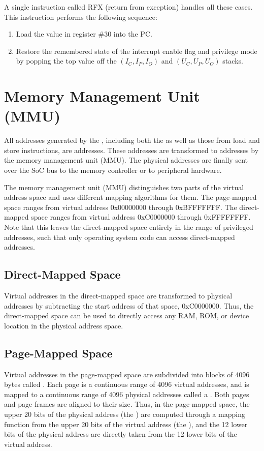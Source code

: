 A single instruction called RFX (return from exception) handles all these cases. This instruction performs the following sequence:
\begin{enumerate}
\item Load the value in register \#30 into the PC.
\item Restore the remembered state of the interrupt enable flag and privilege mode by popping the top value off the $(I_C, I_P, I_O)$ and $(U_C, U_P, U_O)$ stacks.
\end{enumerate}

\section{Memory Management Unit (MMU)}

All addresses generated by the \ecox, including both the \pc as well as those from load and store instructions, are  addresses. These addresses are transformed to  addresses by the memory management unit (MMU). The physical addresses are finally sent over the SoC bus to the memory controller or to peripheral hardware.

The memory management unit (MMU) distinguishes two parts of the virtual address space and uses different mapping algorithms for them. The page-mapped space ranges from virtual address 0x00000000 through 0xBFFFFFFF. The direct-mapped space ranges from virtual address 0xC0000000 through 0xFFFFFFFF. Note that this leaves the direct-mapped space entirely in the range of privileged addresses, such that only operating system code can access direct-mapped addresses.

\subsection{Direct-Mapped Space}

Virtual addresses in the direct-mapped space are transformed to physical addresses by subtracting the start address of that space, 0xC0000000. Thus, the direct-mapped space can be used to directly access any RAM, ROM, or device location in the physical address space.

\subsection{Page-Mapped Space}

Virtual addresses in the page-mapped space are subdivided into blocks of 4096 bytes called . Each page is a continuous range of 4096 virtual addresses, and is mapped to a continuous range of 4096 physical addresses called a . Both pages and page frames are aligned to their size. Thus, in the page-mapped space, the upper 20 bits of the physical address (the ) are computed through a mapping function from the upper 20 bits of the virtual address (the ), and the 12 lower bits of the physical address are directly taken from the 12 lower bits of the virtual address.

